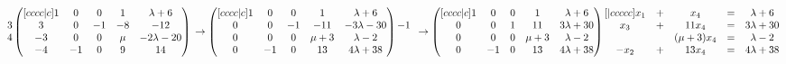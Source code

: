\documentclass{article}
\begin{document}
\begin{math}
\begin{matrix}
          3\\
          4
        \end{matrix}
        \begin{pmatrix}[cccc|c]
            1 & 0 & 0 & 1 & \lambda + 6\\
            3 & 0 & -1 & -8 & -12\\
            -3 & 0 & 0 & \mu & -2\lambda - 20\\
            -4 & -1 & 0 & 9 & 14
        \end{pmatrix}\\
        \\
        \\
        \to
        \begin{pmatrix}[cccc|c]
            1 & 0 & 0 & 1 & \lambda + 6\\
            0 & 0 & -1 & -11 & -3\lambda - 30\\
            0 & 0 & 0 & \mu + 3 & \lambda - 2\\
            0 & -1 & 0 & 13 & 4\lambda + 38
        \end{pmatrix}
        \begin{matrix}
          ~\\
          -1\\
          ~\\
          ~
        \end{matrix}\\
        \\
        \\
        \to
        \begin{pmatrix}[cccc|c]
            1 & 0 & 0 & 1 & \lambda + 6\\
            0 & 0 & 1 & 11 & 3\lambda + 30\\
            0 & 0 & 0 & \mu + 3 & \lambda - 2\\
            0 & -1 & 0 & 13 & 4\lambda + 38
        \end{pmatrix}\\
        \\
        \\
        \begin{matrix}[|ccccc]
            x_1 & + & x_4 & = & \lambda + 6\\
            x_3 & + & 11x_4 & = & 3\lambda + 30\\
            ~ & ~ & (\mu + 3)x_4 & = & \lambda - 2\\
            -x_2 & + & 13x_4 & = & 4\lambda + 38
        \end{matrix}
    \end{math}\\
\end{document}
